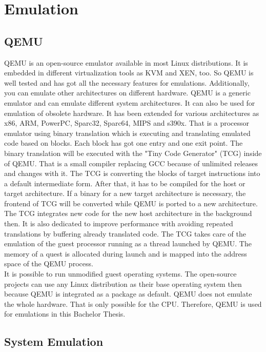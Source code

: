 
\chapter{Emulation}\label{ch:emulation}

\section{QEMU}

QEMU is an open-source emulator available in most Linux distributions. It is embedded in different virtualization tools as KVM and XEN, too. So QEMU is well tested and has got all the necessary features for emulations. 
Additionally, you can emulate other architectures on different hardware. QEMU is a generic emulator and can emulate different system architectures. It can also be used for emulation of obsolete hardware\cite[~p.24]{Opsahl2013}. 
It has been extended for various architectures as x86, ARM, PowerPC, Sparc32, Sparc64, MIPS and s390x.
That is a processor emulator using binary translation\cite{Butt2011} which is executing and translating emulated code based on blocks. Each block has got one entry and one exit point\cite[~p.5]{Wang2010}. 
The binary translation will be executed with the "Tiny Code Generator" (TCG) inside of QEMU. 
That is a small compiler replacing GCC because of unlimited releases and changes with it. The TCG is converting the blocks of target instructions into a default intermediate form. 
After that, it has to be compiled for the host or target architecture. 
If a binary for a new target architecture is necessary, the frontend of TCG will be converted while QEMU is ported to a new architecture. 
The TCG integrates new code for the new host architecture in the background then. It is also dedicated to improve performance with avoiding repeated translations by buffering already translated code\cite{Cota2017}. 
The TCG takes care of the emulation of the guest processor running as a thread launched by QEMU. The memory of a quest is allocated during launch and is mapped into the address space of the QEMU process\cite[~p.29]{Opsahl2013}.\\
It is possible to run unmodified guest operating systems. The open-source projects can use any Linux distribution as their base operating system then because QEMU is integrated as a package as default. 
QEMU does not emulate the whole hardware. That is only possible for the CPU. Therefore, QEMU is used for emulations in this Bachelor Thesis.

\section{System Emulation}


